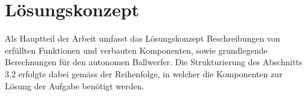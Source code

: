 \section{Lösungskonzept}
Als Hauptteil der Arbeit umfasst das Lösungskonzept Beschreibungen von erfüllten Funktionen und verbauten Komponenten, sowie 
grundlegende Berechnungen für den autonomen Ballwerfer. Die Strukturierung des Abschnitts 3.2 erfolgte dabei gemäss der Reihenfolge, in welcher die Komponenten zur Lösung der Aufgabe benötigt werden.